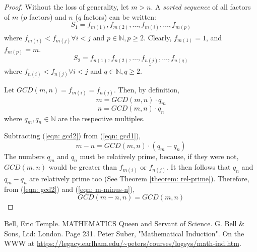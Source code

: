 \documentclass[a4paper]{article}
\begin{document}
\begin{proof}
    Without the loss of generality, let $m > n$. A \emph{sorted sequence} of all factors of $m$ ($p$ factors) and $n$ ($q$ factors) can be written:
\begin{equation}
\label{eqn: s1}
    S_1 = f_{m(1)}, f_{m(2)}, \dots, \underline{f_{m(i)}}, \dots, f_{m(p)} 
\end{equation}
    where $f_{m(i)} < f_{m(j)} \forall i < j$ and $p \in \mathbb{N}, p \ge 2$. Clearly, $f_{m(1)} = 1$, and $f_{m(p)} = m$.
\begin{equation}
\label{eqn: s2}
    S_2 = f_{n(1)}, f_{n(2)}, \dots, \underline{f_{n(j)}}, \dots, f_{n(q)}
\end{equation}
    where $f_{n(i)} < f_{n(j)} \forall i < j$ and $q \in \mathbb{N}, q \ge 2$.

Let $GCD(m, n) = f_{m(i)} = f_{n(j)}$. Then, by definition, 
\begin{equation}
\label{eqn: gcd1}
    m = GCD(m, n) \cdot q_{m}
\end{equation}
\begin{equation}
\label{eqn: gcd2}
    n = GCD(m, n) \cdot q_{n}
\end{equation}
where $q_{m}, q_{n} \in \mathbb{N}$ are the respective multiples.

    Subtracting  (\ref{eqn: gcd2}) from (\ref{eqn: gcd1}), 
\begin{equation}
\label{eqn: m-minus-n}
    m - n = GCD(m, n) \cdot (q_{m} - q_{n})
\end{equation}
    The numbers $q_{m}$ and $q_{n}$ must be relatively prime, because, if they were not, $GCD(m, n)$ would be greater than $f_{m(i)}$ or $f_{n(j)}$. It then follows that $q_{n}$ and $q_{m}-q_{n}$ are relatively prime too (See Theorem \ref{theorem: rel-prime}). Therefore, from (\ref{eqn: gcd2}) and (\ref{eqn: m-minus-n}), 
$$
GCD(m-n, n) = GCD(m, n)
$$
\end{proof}
\begin{thebibliography}{00}
     Bell, Eric Temple. MATHEMATICS Queen and Servant of Science. G. Bell \& Sons, Ltd: London. Page 231.
     Peter Suber, "Mathematical Induction". On the WWW at \url{https://legacy.earlham.edu/~peters/courses/logsys/math-ind.htm}.
\end{thebibliography}
\end{document}
